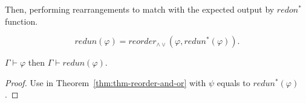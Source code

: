 \documentclass[../main.tex]{subfiles}
\begin{document}
Then, performing rearrangements to match with the expected output
by $redon^{*}$ function.

\begin{equation*}
  \label{eq:redun}
  redun(φ) = reorder_{∧∨}(φ, redun^{*}(φ)).
\end{equation*}

\begin{theorem}
  \label{thm:thm_redun}
  $Γ ⊢ φ$ then $Γ ⊢ redun(φ)$.
\end{theorem}

\begin{proof}
Use in Theorem~\ref{thm:thm-reorder-and-or} with $ψ$ equals to
$redun^{*}(φ)$.
\end{proof}

\end{document}
